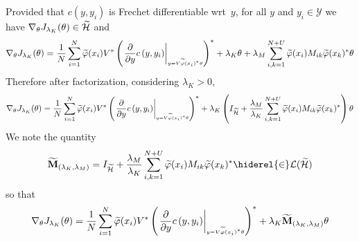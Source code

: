 Provided that $c(y,y_i)$ is Frechet differentiable \acs{wrt}~$y$, for all $y$
and $y_i\in\mathcal{Y}$ we have $\nabla_{\theta} J_{\lambda_K}(\theta) \in
\widetilde{\mathcal{H}}$ and
\begin{dmath*}
    \nabla_{\theta} J_{\lambda_K}(\theta) = \frac{1}{N}\sum_{i=1}^N
    \tildePhi{\omega}(x_i)V^\adjoint \left(\lderivativeat{c\left(y,
    y_i\right)}{y}{V\tildePhi{\omega}(x_i)^\adjoint \theta}\right)^\adjoint +
    \lambda_K\theta + \lambda_M\sum_{i,k=1}^{N+U} \tildePhi{\omega}(x_i)M_{ik}
    \tildePhi{\omega}(x_k)^\adjoint \theta
\end{dmath*}
Therefore after factorization, considering $\lambda_K > 0$,
\begin{dmath*}
    \nabla_{\theta} J_{\lambda_K}(\theta)
    = \frac{1}{N}\sum_{i=1}^N \tildePhi{\omega}(x_i)V^\adjoint
    \left(\lderivativeat{c\left(y,
    y_i\right)}{y}{V\tildePhi{\omega}(x_i)^\adjoint \theta}\right)^\adjoint +
    \lambda_K\left(I_{\tildeH{\omega}} + \frac{\lambda_M}{\lambda_K}
    \sum_{i,k=1}^{N+U} \tildePhi{\omega}(x_i)M_{ik}
    \tildePhi{\omega}(x_k)^\adjoint \right)\theta
\end{dmath*}
We note the quantity
\begin{dmath}
    \widetilde{\mathbf{M}}_{\left(\lambda_K,\lambda_M\right)}
    = I_{\tildeH{\omega}} + \frac{\lambda_M}{\lambda_K}\sum_{i,k=1}^{N+U}
    \tildePhi{\omega}(x_i) M_{ik} \tildePhi{\omega}(x_k)^\adjoint \hiderel{\in}
    \mathcal{L}(\tildeH{\omega})
\end{dmath}
so that
\begin{dmath*}
    \nabla_{\theta} J_{\lambda_K}(\theta)
    = \frac{1}{N}\sum_{i=1}^N \tildePhi{\omega}(x_i)V^\adjoint
    \left(\lderivativeat{c\left(y,
    y_i\right)}{y}{V\tildePhi{\omega}(x_i)^\adjoint \theta}\right)^\adjoint +
    \lambda_K\widetilde{\mathbf{M}}_{\left(\lambda_K,\lambda_M\right)}\theta
\end{dmath*}
